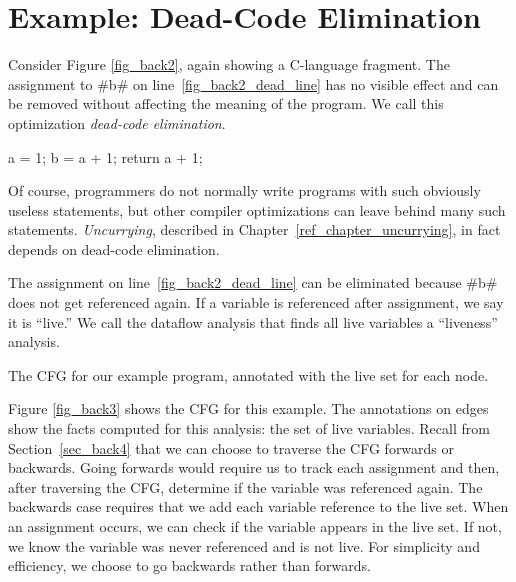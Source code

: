 \documentclass[12pt]{report}
\begin{document}
\section{Example: Dead-Code Elimination}
\label{sec_back2}


Consider Figure \ref{fig_back2}, again showing a C-language fragment.
The assignment to #b# on line~\ref{fig_back2_dead_line} has no visible
effect and can be removed without affecting the meaning of the
program. We call this optimization \emph{dead-code elimination}.

\begin{myfig}[ht]
\begin{minipage}{1in}
  \begin{AVerb}[numbers=left]
    a = 1;
    b = a + 1;\label{fig_back2_dead_line}
    return a + 1;
  \end{AVerb}
\end{minipage}
\caption{A C-language fragment illustrating \emph{dead code}. After
assignment on line \ref{fig_back2_dead_line}, \verb=b= is not used
and can be considered ``dead.''}
\label{fig_back2}
\end{myfig}

Of course, programmers do not normally write programs with such
obviously useless statements, but other compiler optimizations can
leave behind many such statements. \emph{Uncurrying}, described in
Chapter~\ref{ref_chapter_uncurrying}, in fact depends on dead-code
elimination.

The assignment on line~\ref{fig_back2_dead_line} can be eliminated
because #b# does not get referenced again. If a variable is referenced
after assignment, we say it is ``live.'' We call the dataflow
analysis that finds all live variables a ``liveness'' analysis. 

\begin{myfig}[th]
\begin{minipage}{2in}

\end{minipage}
\caption{The CFG for our example program, annotated with the live
set for each node.}
\label{fig_back3}
\end{myfig}

Figure \ref{fig_back3} shows the CFG for this example. The annotations
on edges show the facts computed for this analysis: the set of live
variables. Recall from Section~\ref{sec_back4} that we can choose to
traverse the CFG forwards or backwards. Going forwards would require
us to track each assignment and then, after traversing the CFG,
determine if the variable was referenced again. The backwards case
requires that we add each variable reference to the live set. When an
assignment occurs, we can check if the variable appears in the live
set. If not, we know the variable was never referenced and is not
live. For simplicity and efficiency, we choose to go backwards rather
than forwards.
\end{document}
